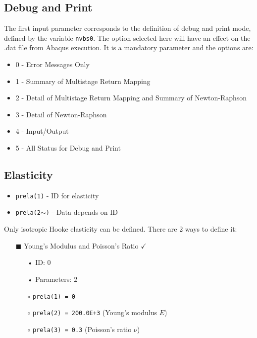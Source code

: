 \documentclass[11pt,a4paper,twoside,final,onecolumn,titlepage]{article}
\newcommand{\verified}{\hspace{0.5pt} {\LARGE $\checkmark$}}
\begin{document}
\subsection{Debug and Print}
\vspace{0.2cm}

The first input parameter corresponds to the definition of debug and print mode, defined by the variable \texttt{nvbs0}. The option selected here will have an effect on the .dat file from Abaqus execution. It is a mandatory parameter and the options are:

\begin{itemize}
	\item 0 - Error Messages Only
	\item 1 - Summary of Multistage Return Mapping
	\item 2 - Detail of Multistage Return Mapping and Summary of Newton-Raphson
	\item 3 - Detail of Newton-Raphson
	\item 4 - Input/Output
	\item 5 - All Status for Debug and Print
\end{itemize}

\vspace{0.2cm}
\subsection{Elasticity}
\vspace{0.2cm}

\begin{itemize}
	\item \texttt{prela(1)} - ID for elasticity
	\item \texttt{prela(2$\mathtt{\sim}$)} - Data depends on ID
\end{itemize}

\noindent Only isotropic Hooke elasticity can be defined. There are 2 ways to define it:

\begin{itemize}
	\item[\tiny$\blacksquare$] Young's Modulus and Poisson’s Ratio \verified{}
	\begin{itemize}
		\item[•] ID: $0$
		\item[•] Parameters: $2$\\
		\item[$\circ$] \texttt{prela(1) = 0}
		\item[$\circ$] \texttt{prela(2) = 200.0E+3} (Young’s modulus $E$)
		\item[$\circ$] \texttt{prela(3) = 0.3} (Poisson's ratio $\nu$)
	\end{itemize}
\end{itemize}
\end{document}
